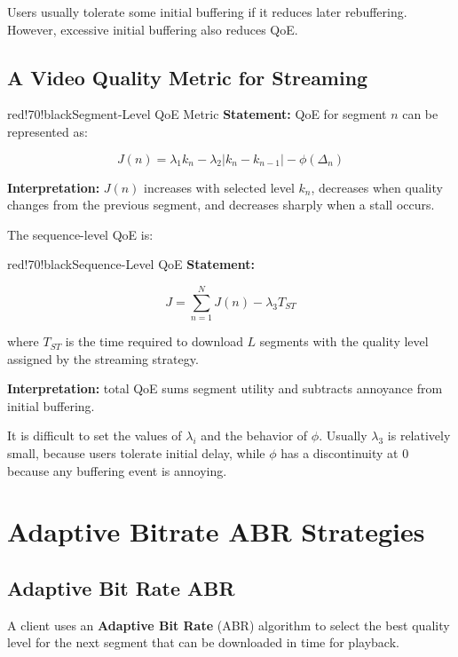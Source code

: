 Users usually tolerate some initial buffering if it reduces later rebuffering. However, excessive initial buffering also reduces QoE.

\subsection{A Video Quality Metric for Streaming}

\begin{calloutbox}{red!70!black}{Segment-Level QoE Metric}
\textbf{Statement:} QoE for segment $n$ can be represented as:

\[
J(n) = \lambda_1 k_n - \lambda_2 |k_n - k_{n-1}| - \phi(\Delta_n)
\]

\textbf{Interpretation:} $J(n)$ increases with selected level $k_n$, decreases when quality changes from the previous segment, and decreases sharply when a stall occurs.
\end{calloutbox}

The sequence-level QoE is:

\begin{calloutbox}{red!70!black}{Sequence-Level QoE}
\textbf{Statement:}

\[
J = \sum_{n=1}^{N} J(n) - \lambda_3 T_{ST}
\]

where $T_{ST}$ is the time required to download $L$ segments with the quality level assigned by the streaming strategy.

\textbf{Interpretation:} total QoE sums segment utility and subtracts annoyance from initial buffering.
\end{calloutbox}

It is difficult to set the values of $\lambda_i$ and the behavior of $\phi$. Usually $\lambda_3$ is relatively small, because users tolerate initial delay, while $\phi$ has a discontinuity at $0$ because any buffering event is annoying.

\section{Adaptive Bitrate ABR Strategies}

\subsection{Adaptive Bit Rate ABR}

A client uses an \textbf{Adaptive Bit Rate} (ABR) algorithm to select the best quality level for the next segment that can be downloaded in time for playback.

